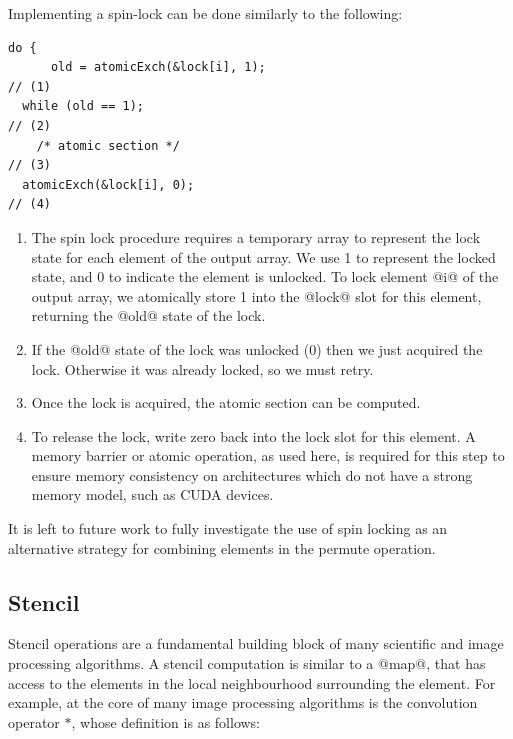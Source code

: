 Implementing a spin-lock can be done similarly to the following:
%
\begin{lstlisting}[style=cuda]
  do {
      old = atomicExch(&lock[i], 1);                                               // (1)
  while (old == 1);                                                                // (2)
    /* atomic section */                                                           // (3)
  atomicExch(&lock[i], 0);                                                         // (4)
\end{lstlisting}
%
\begin{enumerate}
    \item The spin lock procedure requires a temporary array to represent the
        lock state for each element of the output array. We use 1 to represent
        the locked state, and 0 to indicate the element is unlocked. To lock
        element @i@ of the output array, we atomically store 1 into the @lock@
        slot for this element, returning the @old@ state of the lock.

    \item If the @old@ state of the lock was unlocked (0) then we just acquired
        the lock. Otherwise it was already locked, so we must retry.

    \item Once the lock is acquired, the atomic section can be computed.

    \item To release the lock, write zero back into the lock slot for this
        element. A memory barrier or atomic operation, as used here, is required
        for this step to ensure memory consistency on architectures which do not
        have a strong memory model, such as CUDA devices.

\end{enumerate}

It is left to future work to fully investigate the use of spin locking as an
alternative strategy for combining elements in the permute operation.


\subsection{Stencil}
\label{sec:parallel_stencil}

Stencil operations are a fundamental building block of many scientific and image
processing algorithms. A stencil computation is similar to a @map@, that has
access to the elements in the local neighbourhood surrounding the element. For
example, at the core of many image processing algorithms is the convolution
operator $*$, whose definition is as follows:

